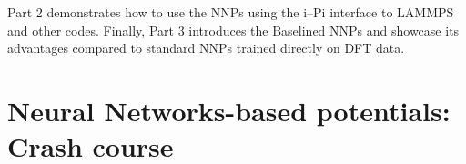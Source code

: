 \documentclass[12pt]{article}
\newcommand\Warning{%
 \makebox[1.4em][c]{%
 \makebox[0pt][c]{\raisebox{.1em}{\small!}}%
 \makebox[0pt][c]{\color{red}\Large$\bigtriangleup$}}}%
\begin{document}

Part 2 demonstrates how to use the NNPs using the i--Pi interface to LAMMPS and other codes. Finally, Part 3 introduces the Baselined NNPs and showcase its advantages compared to standard NNPs trained directly on DFT data. %
\newpage
%

\section{Neural Networks-based potentials: Crash course}
%
\end{document}
